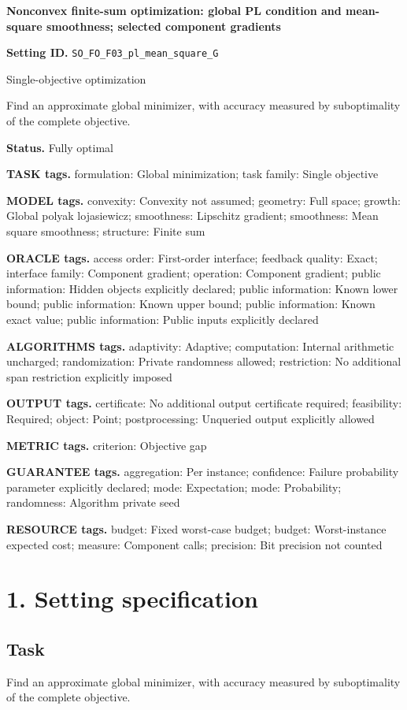 \documentclass[10pt,a4paper]{article}
\begin{document}
\raggedright

{\LARGE\bfseries\sffamily\color{AtlasNavy} Nonconvex finite-sum optimization: global PL condition and mean-square smoothness; selected component gradients\par}\vspace{5pt}
\textbf{Setting ID.} \texttt{SO\_\allowbreak{}FO\_\allowbreak{}F03\_\allowbreak{}pl\_\allowbreak{}mean\_\allowbreak{}square\_\allowbreak{}G}

Single-objective optimization

Find an approximate global minimizer, with accuracy measured by suboptimality of the complete objective.

\textbf{Status.} Fully optimal

\textbf{TASK tags.} formulation: Global minimization; task family: Single objective

\textbf{MODEL tags.} convexity: Convexity not assumed; geometry: Full space; growth: Global polyak lojasiewicz; smoothness: Lipschitz gradient; smoothness: Mean square smoothness; structure: Finite sum

\textbf{ORACLE tags.} access order: First-order interface; feedback quality: Exact; interface family: Component gradient; operation: Component gradient; public information: Hidden objects explicitly declared; public information: Known lower bound; public information: Known upper bound; public information: Known exact value; public information: Public inputs explicitly declared

\textbf{ALGORITHMS tags.} adaptivity: Adaptive; computation: Internal arithmetic uncharged; randomization: Private randomness allowed; restriction: No additional span restriction explicitly imposed

\textbf{OUTPUT tags.} certificate: No additional output certificate required; feasibility: Required; object: Point; postprocessing: Unqueried output explicitly allowed

\textbf{METRIC tags.} criterion: Objective gap

\textbf{GUARANTEE tags.} aggregation: Per instance; confidence: Failure probability parameter explicitly declared; mode: Expectation; mode: Probability; randomness: Algorithm private seed

\textbf{RESOURCE tags.} budget: Fixed worst-case budget; budget: Worst-instance expected cost; measure: Component calls; precision: Bit precision not counted

\section{1. Setting specification}
\subsection{Task}
Find an approximate global minimizer, with accuracy measured by suboptimality of the complete objective.
\end{document}

